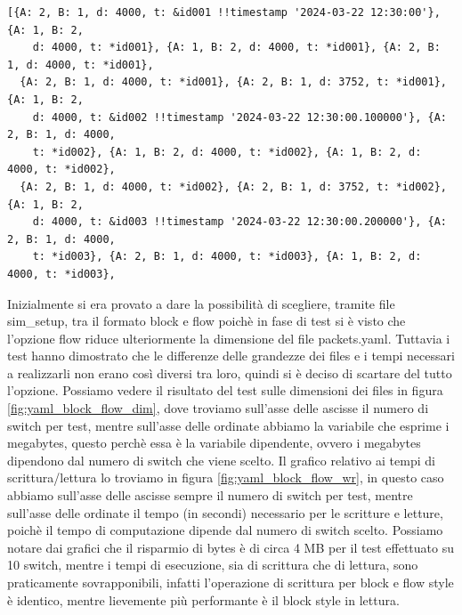 \documentclass[binding=0.6cm]{sapthesis}
\begin{document}
{\scriptsize %
\begin{lstlisting}[caption={rappresentazione di un pacchetto con descrizione completa}, label={codice:long_description_packet}, breaklines=true]
[{A: 2, B: 1, d: 4000, t: &id001 !!timestamp '2024-03-22 12:30:00'}, {A: 1, B: 2,
    d: 4000, t: *id001}, {A: 1, B: 2, d: 4000, t: *id001}, {A: 2, B: 1, d: 4000, t: *id001},
  {A: 2, B: 1, d: 4000, t: *id001}, {A: 2, B: 1, d: 3752, t: *id001}, {A: 1, B: 2,
    d: 4000, t: &id002 !!timestamp '2024-03-22 12:30:00.100000'}, {A: 2, B: 1, d: 4000,
    t: *id002}, {A: 1, B: 2, d: 4000, t: *id002}, {A: 1, B: 2, d: 4000, t: *id002},
  {A: 2, B: 1, d: 4000, t: *id002}, {A: 2, B: 1, d: 3752, t: *id002}, {A: 1, B: 2,
    d: 4000, t: &id003 !!timestamp '2024-03-22 12:30:00.200000'}, {A: 2, B: 1, d: 4000,
    t: *id003}, {A: 2, B: 1, d: 4000, t: *id003}, {A: 1, B: 2, d: 4000, t: *id003},
\end{lstlisting}
}
Inizialmente si era provato a dare la possibilità di scegliere, tramite file sim\_setup, 
tra il formato block e flow poichè in fase di test
si è visto che l'opzione flow riduce ulteriormente la dimensione del file packets.yaml. Tuttavia i test hanno dimostrato che le differenze delle grandezze
dei files e i tempi necessari a realizzarli non erano così diversi tra loro, quindi si è deciso di scartare del tutto l'opzione. Possiamo vedere
il risultato del test sulle dimensioni dei files in figura \ref{fig:yaml_block_flow_dim}, dove troviamo sull'asse delle ascisse il numero di switch per test, mentre
sull'asse delle ordinate abbiamo la variabile che esprime i megabytes, questo perchè essa è la variabile dipendente, ovvero i megabytes dipendono dal numero di switch
che viene scelto. Il grafico relativo ai tempi di scrittura/lettura lo troviamo in 
figura \ref{fig:yaml_block_flow_wr}, in questo caso abbiamo sull'asse delle ascisse sempre il numero di switch per test, mentre sull'asse delle ordinate
il tempo (in secondi) necessario per le scritture e letture, poichè il tempo di computazione dipende dal numero di switch scelto. Possiamo notare dai grafici che il risparmio di bytes è di circa 4 MB per il test effettuato su 10 switch, mentre
i tempi di esecuzione, sia di scrittura che di lettura, sono praticamente sovrapponibili, infatti l'operazione di scrittura per block e flow style è identico, mentre lievemente
più performante è il block style in lettura.
\end{document}
